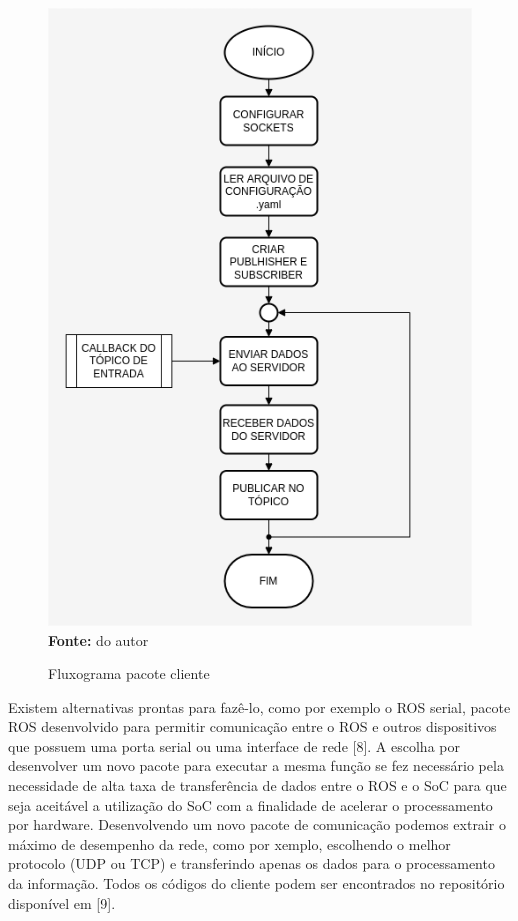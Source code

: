 \begin{figure}[ht]
	\caption{Fluxograma pacote cliente}
	\begin{center}
		\includegraphics[scale=0.47]{imagens/fluxogramaCliente.png}\\
		{\small \textbf{Fonte:} do autor}
    \end{center}\label{fig:clientfluxo}
\end{figure}

Existem alternativas prontas para fazê-lo, como por exemplo o ROS serial, pacote ROS desenvolvido para permitir comunicação entre o ROS e outros dispositivos que possuem uma porta serial ou uma interface de rede [8]. A escolha por desenvolver um novo pacote para executar a mesma função se fez necessário pela necessidade de alta taxa de transferência de dados entre o ROS e o SoC para que seja aceitável a utilização do SoC com a finalidade de acelerar o processamento por hardware. Desenvolvendo um novo pacote de comunicação podemos extrair o máximo de desempenho da rede, como por  xemplo, escolhendo o melhor protocolo (UDP ou TCP) e transferindo apenas os dados para o processamento da informação. Todos os códigos do cliente podem ser encontrados no repositório disponível em [9].
